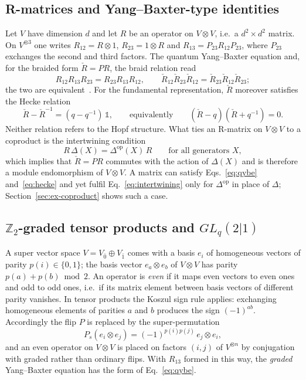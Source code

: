 \documentclass{SciPost}
\newcommand{\GL}{GL_q(2|1)}
\begin{document}
\subsection{R-matrices and Yang--Baxter-type identities}
\label{sec:ybe}

Let $V$ have dimension $d$ and let $R$ be an operator on $V\otimes V$, i.e.\ a $d^2\times d^2$ matrix. On $V^{\otimes3}$ one writes $R_{12}=R\otimes 1$, $R_{23}=1\otimes R$ and $R_{13}=P_{23}R_{12}P_{23}$, where $P_{23}$ exchanges the second and third factors. The quantum Yang--Baxter equation and, for the braided form $\check R=PR$, the braid relation read
\begin{equation}
R_{12}R_{13}R_{23}=R_{23}R_{13}R_{12},\qquad
\check R_{12}\check R_{23}\check R_{12}=\check R_{23}\check R_{12}\check R_{23};
\label{eq:qybe}
\end{equation}
the two are equivalent~\cite{kassel1995}. For the fundamental representation, $\check R$ moreover satisfies the Hecke relation
\begin{equation}
\check R-\check R^{-1}=(q-q^{-1})\,\mathbb{1},\qquad\text{equivalently}\qquad (\check R-q)(\check R+q^{-1})=0 .
\label{eq:hecke}
\end{equation}
Neither relation refers to the Hopf structure. What ties an R-matrix on $V\otimes V$ to a coproduct is the intertwining condition
\begin{equation}
R\,\Delta(X)=\Delta^{\mathrm{op}}(X)\,R\qquad\text{for all generators }X,
\label{eq:intertwining}
\end{equation}
which implies that $\check R=PR$ commutes with the action of $\Delta(X)$ and is therefore a module endomorphism of $V\otimes V$. A matrix can satisfy Eqs.~\eqref{eq:qybe} and~\eqref{eq:hecke} and yet fulfil Eq.~\eqref{eq:intertwining} only for $\Delta^{\mathrm{op}}$ in place of $\Delta$; Section~\ref{sec:ex-coproduct} shows such a case.

\subsection{\texorpdfstring{$\mathbb{Z}_2$}{Z2}-graded tensor products and \texorpdfstring{$\GL$}{GLq(2|1)}}
\label{sec:grading}

A super vector space $V=V_{\bar0}\oplus V_{\bar1}$ comes with a basis $e_i$ of homogeneous vectors of parity $p(i)\in\{0,1\}$; the basis vector $e_a\otimes e_b$ of $V\otimes V$ has parity $p(a)+p(b)\bmod 2$. An operator is \emph{even} if it maps even vectors to even ones and odd to odd ones, i.e.\ if its matrix element between basis vectors of different parity vanishes. In tensor products the Koszul sign rule applies: exchanging homogeneous elements of parities $a$ and $b$ produces the sign $(-1)^{ab}$. Accordingly the flip $P$ is replaced by the super-permutation
\begin{equation}
P_s(e_i\otimes e_j)=(-1)^{p(i)p(j)}\,e_j\otimes e_i ,
\label{eq:superperm}
\end{equation}
and an even operator on $V\otimes V$ is placed on factors $(i,j)$ of $V^{\otimes n}$ by conjugation with graded rather than ordinary flips. With $R_{13}$ formed in this way, the \emph{graded} Yang--Baxter equation has the form of Eq.~\eqref{eq:qybe}.
\end{document}
